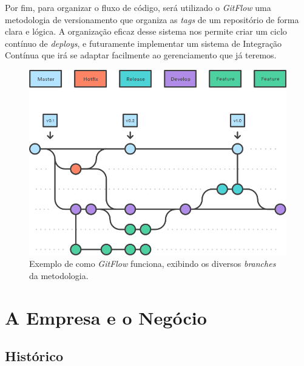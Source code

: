 \documentclass[a4paper]{abntex2}
\begin{document}
Por fim, para organizar o fluxo de código, será utilizado o \emph{GitFlow}\cite{gitflow} uma metodologia de versionamento que organiza as \emph{tags} de um repositório de forma clara e lógica. A organização eficaz desse sistema nos permite criar um ciclo contínuo de \emph{deploys}, e futuramente implementar um sistema de Integração Contínua\footnotemark{} que irá se adaptar facilmente ao gerenciamento que já teremos.


\begin{figure}[!hb]
	\centering
	\includegraphics[width=0.7\linewidth]{imagens/gitflow.png}
	\caption{Exemplo de como \emph{GitFlow} funciona, exibindo os diversos \emph{branches} da metodologia.}
\end{figure}


\chapter{A Empresa e o Negócio}

\section{Histórico}
\end{document}
